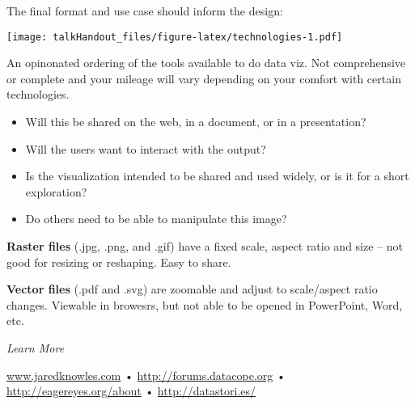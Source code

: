 \documentclass{tufte-handout}
\begin{document}
\noindent The final format and use case should inform the design:

\begin{marginfigure}
 \texttt{[image: talkHandout\_files/figure-latex/technologies-1.pdf]}
\caption{An opinonated ordering of the tools available to do data viz. Not comprehensive or complete and your mileage will vary depending on your comfort with certain technologies.}
\end{marginfigure}

\begin{itemize}
\itemsep1pt\parskip0pt
\item
  Will this be shared on the web, in a document, or in a presentation?
\item
  Will the users want to interact with the output?
\item
  Is the visualization intended to be shared and used widely, or is it
  for a short exploration?
\item
  Do others need to be able to manipulate this image?
\end{itemize}

\noindent \textbf{Raster files} (.jpg, .png, and .gif) have a fixed scale, 
aspect ratio and size -- not good for resizing or reshaping. Easy to share.

\vspace{2.5mm}

\noindent \textbf{Vector files} (.pdf and .svg) are zoomable and adjust to
scale/aspect ratio changes. Viewable in browesrs, but not able to be
opened in PowerPoint, Word, etc.

\vspace{2.5mm}
\noindent \emph{Learn More}

\noindent \href{http://www.jaredknowles.com/presentations}{\url{www.jaredknowles.com}} •
\href{http://forums.datacope.org}{\url{http://forums.datacope.org}} •
\href{http://eagereyes.org/about}{\url{http://eagereyes.org/about}} •
\href{http://datastori.es/}{\url{http://datastori.es/}}
\end{document}
